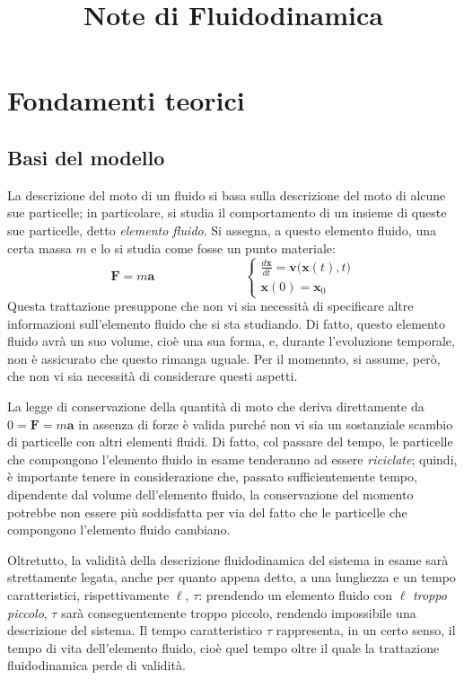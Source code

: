 \documentclass[11pt, a4paper]{scrartcl}
\title{Note di Fluidodinamica}
\author{}
\date{}
\theoremstyle{style}
\theoremstyle{style1}
\renewcommand{\maketitle}{
\begin{center}
{\sffamily
{\fontsize{20}{20}\selectfont\MakeUppercase\thetitle}}

\vspace{0.2in}

{\large\scshape\sffamily\theauthor}
\end{center}
}
\numberwithin{equation}{subsection}
\begin{document}
\maketitle
\newpage
\tableofcontents 
\newpage
\section{Fondamenti teorici}

\subsection{Basi del modello}
La descrizione del moto di un fluido si basa sulla descrizione del moto di alcune sue particelle; in particolare, si studia il comportamento di un insieme di queste sue particelle, detto \textit{elemento fluido}.
Si assegna, a questo elemento fluido, una certa massa $m$ e lo si studia come fosse un punto materiale:
\[
\mathbf{F}  = m\mathbf{a}  \hspace{3cm} \begin{cases}
	\displaystyle \frac{d \mathbf{x} }{d t} = \mathbf{v} \big(\mathbf{x} (t) , t\big)\\
	\mathbf{x} (0) = \mathbf{x} _0
\end{cases} 
\] 
Questa trattazione presuppone che non vi sia necessit\`a di specificare altre informazioni sull'elemento fluido che si sta studiando.
Di fatto, questo elemento fluido avr\`a un suo volume, cio\`e una sua forma, e, durante l'evoluzione temporale, non \`e assicurato che questo rimanga uguale.
Per il momennto, si assume, per\`o, che non vi sia necessit\`a di considerare questi aspetti.

La legge di conservazione della quantit\`a di moto che deriva direttamente da $0=\mathbf{F}  = m\mathbf{a} $ in assenza di forze \`e valida purch\'e non vi sia un sostanziale scambio di particelle con altri elementi fluidi.
Di fatto, col passare del tempo, le particelle che compongono l'elemento fluido in esame tenderanno ad essere \textit{riciclate}; quindi, \`e importante tenere in considerazione che, passato sufficientemente tempo, dipendente dal volume dell'elemento fluido, la conservazione del momento potrebbe non essere pi\`u soddisfatta per via del fatto che le particelle che compongono l'elemento fluido cambiano.

Oltretutto, la validit\`a della descrizione fluidodinamica del sistema in esame sar\`a strettamente legata, anche per quanto appena detto, a una lunghezza e un tempo caratteristici, rispettivamente $\ell$, $ \tau $: prendendo un elemento fluido con $\ell $ \textit{troppo piccolo}, $\tau $ sar\`a conseguentemente troppo piccolo, rendendo impossibile una descrizione del sistema.
Il tempo caratteristico $\tau $ rappresenta, in un certo senso, il tempo di vita dell'elemento fluido, cio\`e quel tempo oltre il quale la trattazione fluidodinamica perde di validit\`a.
\end{document}

